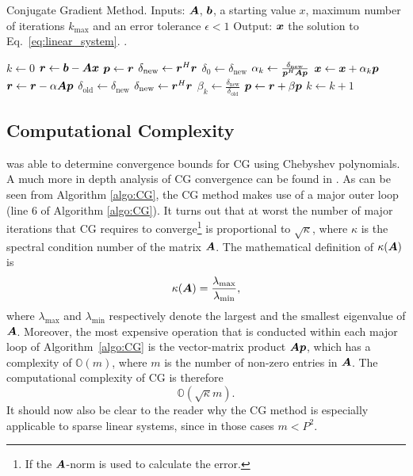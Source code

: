 \documentclass[useAMS,usenatbib]{mn2e}
\newcommand{\bA}{\bmath{A}}
\newcommand{\br}{\bmath{r}}
\newcommand{\bb}{\bmath{b}}
\newcommand{\bx}{\bmath{x}}
\newcommand{\bp}{\bmath{p}}
\begin{document}

\begin{algorithm}
\caption{Conjugate Gradient Method. Inputs: $\bA$, $\bb$, a starting value $x$, maximum number of iterations $k_{\textrm{max}}$ and an error tolerance $\epsilon<1$ Output: $\bx$ the solution to Eq.~\eqref{eq:linear_system}. \citep{Shewchuk1994}.}\label{algo:CG}
\begin{algorithmic}[1]
\State $k \gets 0$
\State $\br \gets \bb - \bA\bx$
\State $\bp \gets \br$
\State $\delta_{\textrm{new}} \gets \br^H\br$
\State $\delta_0 \gets \delta_{\textrm{new}}$
\State $\alpha_k \gets \frac{\delta_{\textrm{new}}}{\bp^H\bA\bp}$
\State $\bx \gets \bx + \alpha_k\bp$
\State $\br \gets \br - \alpha\bA\bp$
\State $\delta_{\textrm{old}} \gets \delta_{\textrm{new}}$ 
\State $\delta_{\textrm{new}} \gets \br^H\br$
\State $\beta_{k} \gets \frac{\delta_{\textrm{new}}}{\delta_{\textrm{old}}}$
\State $\bp \gets \br + \beta\bp$
\State $k \gets k + 1$
\EndWhile
\end{algorithmic}
\end{algorithm}

\subsection{Computational Complexity}
\citet{Kaniel1966} was able to determine convergence bounds for CG using Chebyshev polynomials. A much more in depth analysis of CG convergence can be found in
\citep{Sluis1986}. As can be seen from Algorithm \ref{algo:CG}, the CG method makes use of a major outer loop (line 6 of Algorithm \ref{algo:CG}). It turns out that at worst 
the number of major iterations that CG requires to converge\footnote{If the $\bA$-norm is used to calculate the error.} is proportional to $\sqrt{\kappa}$, where $\kappa$ is the spectral condition number of the matrix $\bA$.
The mathematical definition of $\kappa(\bA)$ is
\begin{equation}
\label{eq:kappa}
\kappa(\bA) = \frac{\lambda_{\textrm{max}}}{\lambda_{\textrm{min}}}, 
\end{equation}
where $\lambda_{\textrm{max}}$ and $\lambda_{\textrm{min}}$ respectively denote the largest and the smallest eigenvalue of $\bA$.
Moreover, the most expensive operation that is conducted within each major loop of Algorithm~\ref{algo:CG} is the vector-matrix product $\bA\bp$, which has a complexity of $\mathbb{O}(m)$, where $m$ is the number of non-zero entries in $\bA$.
The computational complexity of CG is therefore 
\begin{equation}
\label{eq:cg_bound}
\mathbb{O}(\sqrt{\kappa}m). 
\end{equation}
It should now also be clear to the reader why the CG method is especially applicable to sparse linear systems, since in those cases $m < P^2$.
\end{document}
